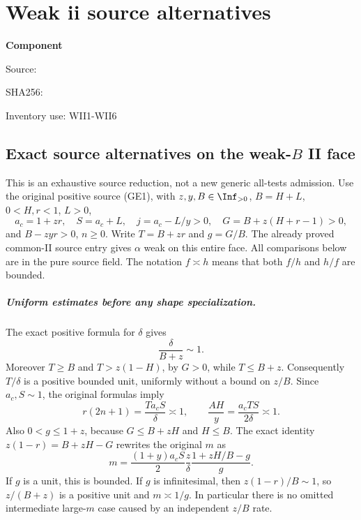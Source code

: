 \chapter{Weak ii source alternatives}
\label{component:p268520f6cc26}
\noindent\textbf{Component }\par
{\small\noindent Source: \par}
{\small\noindent SHA256: \par}
{\small\noindent Inventory use: WII1-WII6\par}
\medskip
\section{Exact source alternatives on the weak-\texorpdfstring{$B$}{B} II face}
\label{p268520f6cc26:sec:r8-weak-ii-source}
This is an exhaustive source reduction, not a new generic all-tests
admission. Use the original positive source (GE1), with
$z,y,B\in\Inf_{>0}$, $B=H+L$, $0<H,r<1$, $L>0$,
\[
 a_c=1+zr,\quad S=a_c+L,\quad j=a_c-L/y>0,
 \quad G=B+z(H+r-1)>0,
\]
and $B-zyr>0$, $n\geq0$. Write $T=B+zr$ and $g=G/B$.
The already proved common-II source entry gives $\alpha$ weak on
this entire face. All comparisons below are in the pure source field.
The notation $f\asymp h$ means that both $f/h$ and $h/f$ are bounded.

\paragraph{Uniform estimates before any shape specialization.}
The exact positive formula for $\delta$ gives
\[
 \frac\delta{B+z}\sim1.
\]
Moreover $T\geq B$ and $T>z(1-H)$, by $G>0$, while $T\leq B+z$.
Consequently $T/\delta$ is a positive bounded unit, uniformly without
a bound on $z/B$. Since $a_c,S\sim1$, the original formulas imply
\[
 r(2n+1)=\frac{Ta_cS}{\delta}\asymp1,
 \qquad \frac{AH}{y}=\frac{a_cTS}{2\delta}\asymp1.
                                                               \tag{WII1}
\]
Also $0<g\leq1+z$, because $G\leq B+zH$ and $H\leq B$.
The exact identity $z(1-r)=B+zH-G$ rewrites the original $m$ as
\[
 m=\frac{(1+y)a_cS}{2}\frac z\delta
       \frac{1+zH/B-g}{g}.                       \tag{WII2}
\]
If $g$ is a unit, this is bounded. If $g$ is infinitesimal, then
$z(1-r)/B\sim1$, so $z/(B+z)$ is a positive unit and
$m\asymp1/g$. In particular there is no omitted intermediate
large-$m$ case caused by an independent $z/B$ rate.

